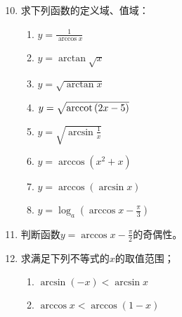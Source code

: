 \begin{enumerate}\setcounter{enumi}{9}
    \item 求下列函数的定义域、值域：
\begin{multicols}{2}
\begin{enumerate}[(1)]
    \item $y=\frac{1}{\arccos x}$
    \item $y=\arctan\sqrt{x}$
    \item $y=\sqrt{\arctan x}$
    \item $y=\sqrt{{\rm arccot\,}(2x-5)}$
    \item $y=\sqrt{\arcsin\frac{1}{x}}$
    \item $y=\arccos(x^2+x)$
    \item $y=\arccos(\arcsin x)$
    \item $y=\log_a\left(\arccos x-\frac{\pi}{3}\right)$
\end{enumerate}
\end{multicols}


\item 判断函数$y=\arccos x-\frac{\pi}{2}$的奇偶性。
\item 求满足下列不等式的$x$的取值范围；
\begin{multicols}{2}
\begin{enumerate}[(1)]
    \item $\arcsin (-x)<\arcsin x$
    \item $\arccos x<\arccos (1-x)$
\end{enumerate}
\end{multicols}

\end{enumerate}


